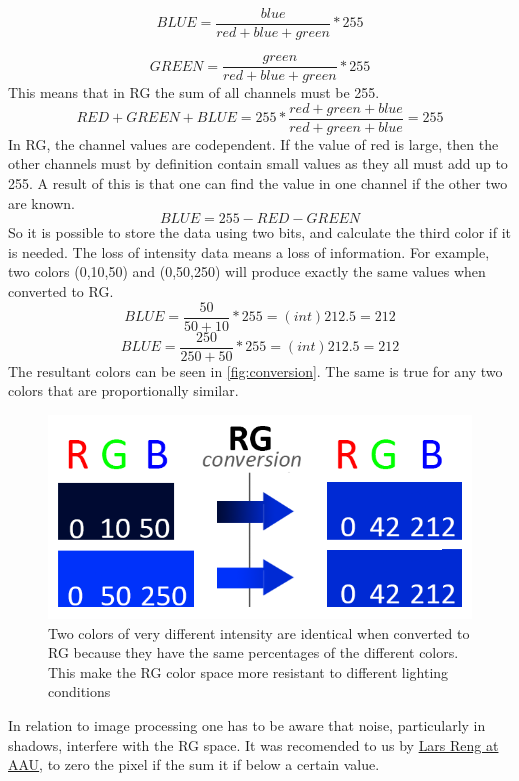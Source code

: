 \begin{equation}
	BLUE = \frac{blue}{red + blue + green} * 255
\end{equation}

\begin{equation}
	GREEN = \frac{green}{red + blue + green} * 255
\end{equation}
This means that in RG the sum of all channels must be 255.
\begin{equation} 
RED + GREEN + BLUE = 255*\frac{red + green + blue}{red + green + blue} = 255
\end{equation} 
In RG, the channel values are codependent. If the value of red is large, then the other channels must by definition contain small values as they all must add up to 255. A result of this is that one can find the value in one channel if the other two are known.
\begin{equation} 
BLUE = 255 - RED - GREEN
\end{equation} 
So it is possible to store the data using two bits, and calculate the third color if it is needed. The loss of intensity data\cite{NormRGB} means a loss of information. For example, two colors (0,10,50) and (0,50,250) will produce exactly the same values when converted to RG.
\begin{equation} 
BLUE = \frac{50}{50 + 10} * 255 = (int)212.5 = 212 
\end{equation}
\begin{equation} 
BLUE = \frac{250}{250 + 50} * 255 = (int)212.5 = 212 
\end{equation} 
The resultant colors can be seen in \autoref{fig:conversion}. The same is true for any two colors that are proportionally similar.\\
\begin{figure}[H]
	\centering
	\includegraphics[width=0.6\linewidth]{figure/Analysis/rgconversion.png}
	\caption{Two colors of very different intensity are identical when converted to RG because they have the same percentages of the different colors. This make the RG color space more resistant to different lighting conditions}
	\label{fig:conversion}
\end{figure} 
In relation to image processing one has to be aware that noise, particularly in shadows, interfere with the RG space. It was recomended to us by \href{http://personprofil.aau.dk/109196}{Lars Reng at AAU},  to zero the pixel if the sum it if below a certain value.

